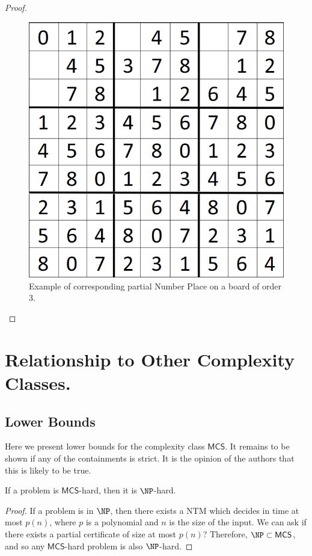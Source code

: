 \documentclass[runningheads,a4paper]{llncs}
\begin{document}
\begin{proof}
\begin{figure}[H]
\label{fig:partialNP}
\centering
\includegraphics[scale=0.25]{sudoku-1.png}
\caption{Example of corresponding partial Number Place on a board of order 3.}
\end{figure}

\end{proof}

\section{Relationship to Other Complexity Classes.}

\subsection{Lower Bounds}

Here we present lower bounds for the complexity class $\mathsf{MCS}$. It remains to be shown if any of the containments is strict. It is the opinion of the authors that this is likely to be true. 

\begin{proposition}
If a problem is $\mathsf{MCS}$-hard, then it is $\NP$-hard.
\end{proposition}

\begin{proof}
If a problem is in $\NP$, then there exists a NTM which decides in time at most $p(n)$, where $p$ is a polynomial and $n$ is the size of the input. We can ask if there exists a partial certificate of size at most $p(n)$? Therefore, $\NP \subset \mathsf{MCS}$, and so any $\mathsf{MCS}$-hard problem is also $\NP$-hard. 
\end{proof}
\end{document}
